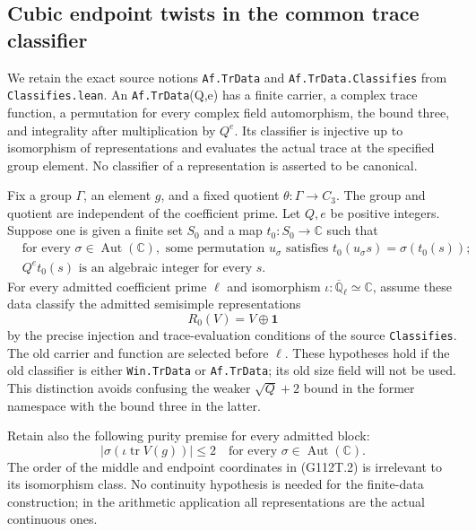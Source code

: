 \subsection{Cubic endpoint twists in the common trace classifier}
\label{sec:cubic-twisted-block-trace-data}

We retain the exact source notions \texttt{Af.TrData} and
\texttt{Af.TrData.Classifies} from \texttt{Classifies.lean}.
An \texttt{Af.TrData}(Q,e) has a finite carrier, a complex trace
function, a permutation for every complex field automorphism, the
bound three, and integrality after multiplication by \(Q^e\).
Its classifier is injective up to isomorphism of representations and
evaluates the actual trace at the specified group element.  No
classifier of a representation is asserted to be canonical.

Fix a group \(\Gamma\), an element \(g\), and a fixed quotient
\(\theta:\Gamma\to C_3\).  The group and quotient are independent of
the coefficient prime.  Let \(Q,e\) be positive integers.  Suppose
one is given a finite set \(S_0\) and a map \(t_0:S_0\to\mathbb C\)
such that
\begin{align*}
 &\text{for every }\sigma\in\operatorname{Aut}(\mathbb C),\text{ some
 permutation }u_\sigma\text{ satisfies }
          t_0(u_\sigma s)=\sigma(t_0(s));\\
 &Q^e t_0(s)\text{ is an algebraic integer for every }s.
                                                        \tag{G112T.1}
\end{align*}
For every admitted coefficient prime \(\ell\) and isomorphism
\(\iota:\overline{\mathbb Q}_\ell\simeq\mathbb C\), assume these data
classify the admitted semisimple representations
\[
                  R_0(V)=V\oplus\mathbf1
                                                        \tag{G112T.2}
\]
by the precise injection and trace-evaluation conditions of the
source \texttt{Classifies}.  The old carrier and function are selected
before \(\ell\).  These hypotheses hold if the old classifier is
either \texttt{Win.TrData} or \texttt{Af.TrData}; its old size field
will not be used.  This distinction avoids confusing the weaker
\(\sqrt Q+2\) bound in the former namespace with the bound three in
the latter.

Retain also the following purity premise for every admitted block:
\[
 \bigl|\sigma(\iota\operatorname{tr}V(g))\bigr|\le2
 \quad\text{for every }\sigma\in\operatorname{Aut}(\mathbb C).
                                                        \tag{G112T.3}
\]
The order of the middle and endpoint coordinates in (G112T.2) is
irrelevant to its isomorphism class.  No continuity hypothesis is
needed for the finite-data construction; in the arithmetic application
all representations are the actual continuous ones.

